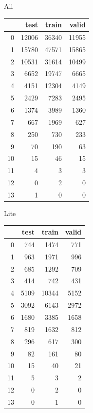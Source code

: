 \documentclass[12pt,journal,compsoc]{IEEEtran}
\begin{document}

All
\begin{table}
\begin{tabular}{rrrr}
\toprule
{} &   test &  train &  valid \\
\midrule
0  &  12006 &  36340 &  11955 \\
1  &  15780 &  47571 &  15865 \\
2  &  10531 &  31614 &  10499 \\
3  &   6652 &  19747 &   6665 \\
4  &   4151 &  12304 &   4149 \\
5  &   2429 &   7283 &   2495 \\
6  &   1374 &   3989 &   1360 \\
7  &    667 &   1969 &    627 \\
8  &    250 &    730 &    233 \\
9  &     70 &    190 &     63 \\
10 &     15 &     46 &     15 \\
11 &      4 &      3 &      3 \\
12 &      0 &      2 &      0 \\
13 &      1 &      0 &      0 \\
\bottomrule
\end{tabular}
\end{table}

Lite
\begin{table}
\begin{tabular}{rrrr}
\toprule
{} &  test &  train &  valid \\
\midrule
0  &   744 &   1474 &    771 \\
1  &   963 &   1971 &    996 \\
2  &   685 &   1292 &    709 \\
3  &   414 &    742 &    431 \\
4  &  5109 &  10344 &   5152 \\
5  &  3092 &   6143 &   2972 \\
6  &  1680 &   3385 &   1658 \\
7  &   819 &   1632 &    812 \\
8  &   296 &    617 &    300 \\
9  &    82 &    161 &     80 \\
10 &    15 &     40 &     21 \\
11 &     5 &      3 &      2 \\
12 &     0 &      2 &      0 \\
13 &     0 &      1 &      0 \\
\bottomrule
\end{tabular}
\end{table}
\end{document}
